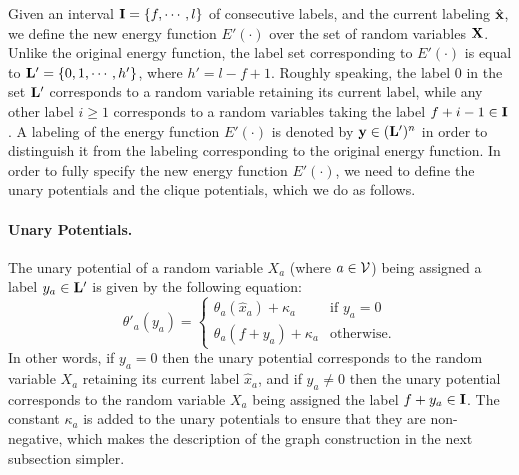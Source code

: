 \documentclass[10pt,letterpaper]{article}
\begin{document}
Given an interval ${\bf I} = \{f,\cdots,l\}$ of consecutive labels, and the current labeling $\hat{\bf x}$, we define the new energy function
$E'(\cdot)$ over the set of random variables ${\bf X}$. Unlike the original energy function, the label set corresponding
to $E'(\cdot)$ is equal to ${\bf L}' = \{0,1,\cdots,h'\}$, where $h'=l - f + 1$.
Roughly speaking, the label $0$ in the set ${\bf L}'$ corresponds
to a random variable retaining its current label, while any other label $i \geq 1$ corresponds to a random variables taking the label
${f + i - 1} \in {\bf I}$. A labeling of the energy function $E'(\cdot)$ is denoted by ${\bf y} \in ({\bf L}')^n$ in order to distinguish
it from the labeling corresponding to the original energy function. In order to fully specify the new energy function $E'(\cdot)$, we need
to define the unary potentials and the clique potentials, which we do as follows.

\paragraph{Unary Potentials.} The unary potential of a random variable $X_a$ (where $a \in {\cal V}$) being assigned a label $y_a \in {\bf L}'$ is
given by the following equation:
\begin{equation}
\theta'_a(y_a) = \left\{
\begin{array}{cl}
\theta_a(\hat{x}_a) + \kappa_a & \mbox{if } y_a = 0\\
\theta_a(f+y_a) + \kappa_a & \mbox{otherwise.}
\end{array}
\right.
\end{equation}
In other words, if $y_a = 0$ then the unary potential corresponds to the random variable $X_a$ retaining its current label $\hat{x}_a$, and if
$y_a \neq 0$ then the unary potential corresponds to the random variable $X_a$ being assigned the label $f+y_a \in {\bf I}$.
The constant $\kappa_a$ is added to the unary potentials to ensure that they are non-negative, which makes the description of the
graph construction in the next subsection simpler.
\end{document}
